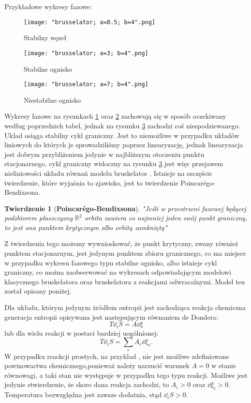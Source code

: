 \documentclass[10pt, a4paper, twoside, onecolumn]{article}
\numberwithin{equation}{section}
\newtheorem*{theorem}{Twierdzenie}
\begin{document}
	Przykładowe wykresy fazowe:
	\begin{figure}[H]\label{stabilny wezel}
		\centering
		\texttt{[image: "brusselator; a=0.5; b=4".png]}
		\caption{Stabilny węzeł}
	\end{figure}
	\begin{figure}[H]\label{stabilne ognisko}
		\centering
		\texttt{[image: "brusselator; a=3; b=4".png]}
		\caption{Stabilne ognisko}
	\end{figure}
	\begin{figure}[H]\label{niestabilne ognisko}
		\centering
		\texttt{[image: "brusselator; a=7; b=4".png]}
		\caption{Niestabilne ognisko}
	\end{figure}
	Wykresy fazowe na rysunkach \ref{stabilny wezel} oraz \ref{stabilne ognisko} zachowują się w sposób oczekiwany według poprzednich tabel, jednak na rysunku \ref{niestabilne ognisko} zachodzi coś niespodziewanego. Układ osiąga stabilny cykl graniczny. Jest to niemożliwe w przypadku układów liniowych do których je sprowadziliśmy poprzez linearyzację, jednak linearyzacja jest dobrym przybliżeniem jedynie w najbliższym otoczeniu punktu stacjonarnego, cykl graniczny widoczny na rysunku \ref{niestabilne ognisko} jest więc przejawem nieliniowości układu równań modelu bruskelator \cite{orlik}. Istnieje na szczęście twierdzenie, które wyjaśnia to zjawisko, jest to twierdzenie Poincar\'{e}go-Bendixsona. \par
	\begin{theorem}[\textbf{Poincar\'{e}go-Bendixsona}]
		"Jeśli w przestrzeni fazowej będącej podzbiorem płaszczyzny \(\mathbb{R}^{2}\) orbita zawiera co najmniej jeden swój punkt graniczny, to jest ona punktem krytycznym albo orbitą zamkniętą" \cite{palczewski}
	\end{theorem}
	Z twierdzenia tego możemy wywnioskować, że punkt krytyczny, zwany również punktem stacjonarnym, jest jedynym punktem zbioru granicznego, co ma miejsce w przypadku wykresu fazowego typu stabilne ognisko, albo istnieje cykl graniczny, co można zaobserwować na wykresach odpowiadającym modelowi klasycznego bruskelatora oraz bruskelatora z reakcjami odwracalnymi. Model ten został opisany poniżej. \par
	Dla układu, którym jedynym żródłem entropii jest zachodząca reakcja chemiczna generacja entropii opisywana jest następującym równaniem de Dondera:
	\begin{equation}\label{de donder}
		T\dd_{i}S=A\dd{\xi}
	\end{equation}
	lub dla wielu reakcji w postaci bardziej uogólnionej: 
	\begin{equation}\label{de donder ogolny}
		T\dd_{i}S=\sum_{r}A_{r}\dd{\xi_{r}}.
	\end{equation}
	W przypadku reackcji prostych, na przykład , nie jest możliwe zdefiniowane powinowactwa chemicznego,ponieważ należy narzucić warunek \(A=0\) w stanie równowagi, a taki stan nie występuje w przypadku tego typu reakcji. Możliwe jest jedynie stwierdzenie, że skoro dana reakcja zachodzi, to \(A_{i}>0\) oraz \(\dd{\xi_{i}}>0\). Temperatura bezwzględna jest zawsze dodatnia, stąd \(\dd_{i}S>0\). \par
\end{document}
